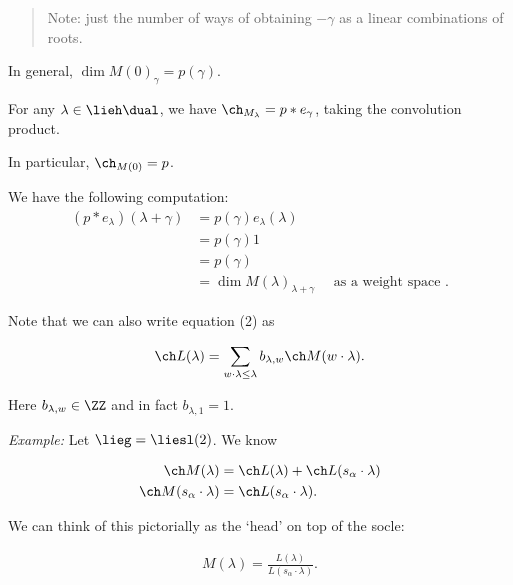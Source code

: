 \begin{quote}
Note: just the number of ways of obtaining \(-\gamma\) as a linear
combinations of roots.
\end{quote}

In general, \(\dim M(0)_\gamma = p(\gamma)\).

\begin{description}
\tightlist
\item[Proposition (Characters as Convolution Products)]
For any \(\lambda \in \lieh\dual\), we have
\(\ch_{M_\lambda} = p\ast e_\gamma\), taking the convolution product.
\end{description}

In particular, \(\ch_{M(0)} = p\).

\begin{description}
\tightlist
\item[Proof (of Proposition)]
We have the following computation: \begin{align*}
(p\ast e_\lambda)(\lambda+\gamma)
&= p(\gamma) e_\lambda(\lambda) \\
&= p(\gamma) 1 \\
&= p(\gamma) \\
&= \dim M(\lambda)_{\lambda + \gamma} \quad\text{ as a weight space }
.\end{align*}
\end{description}

Note that we can also write equation (2) as

\begin{align*}
\ch L(\lambda) = \sum_{w\cdot \lambda \leq \lambda} b_{\lambda, w} \ch M(w\cdot \lambda)
.\end{align*}

Here \(b_{\lambda, w} \in \ZZ\) and in fact \(b_{\lambda, 1} = 1\).

\emph{Example:} Let \(\lieg = \liesl(2)\). We know

\begin{align*}
\ch M(\lambda) &= \ch L(\lambda) + \ch L(s_\alpha \cdot \lambda) \\
\ch M(s_\alpha \cdot \lambda) &= \ch L(s_\alpha \cdot \lambda)
.\end{align*}

We can think of this pictorially as the `head' on top of the socle:

\begin{align*}
M(\lambda) = \frac{L(\lambda)}{L(s_\alpha \cdot \lambda)}
.\end{align*}

